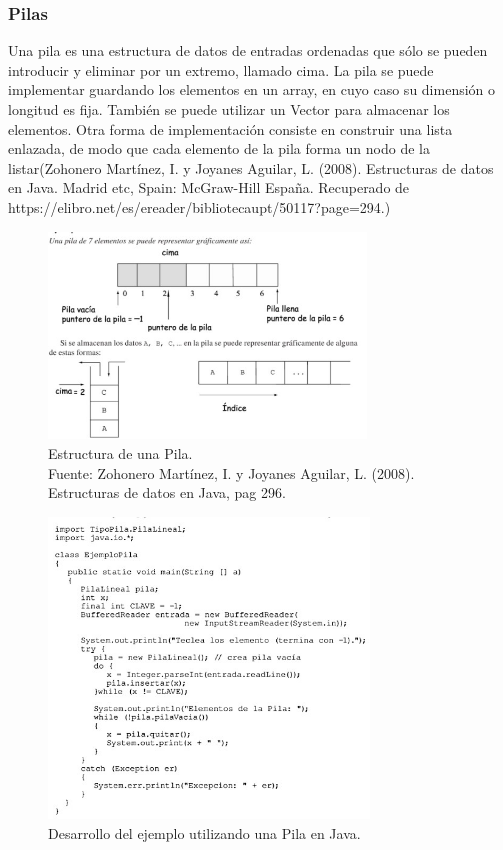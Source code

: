 \documentclass{article}
\begin{document}
\subsubsection{Pilas}
Una pila es una estructura de datos de entradas ordenadas que sólo se pueden introducir y eliminar por un extremo, llamado cima. La pila se puede implementar guardando los elementos en un array, en cuyo caso su dimensión o longitud es fija. También se puede utilizar un Vector para almacenar los elementos. Otra forma de implementación consiste en construir una lista enlazada, de modo que cada elemento de la pila forma un nodo de la listar(Zohonero Martínez, I. y Joyanes Aguilar, L. (2008). Estructuras de datos en Java. Madrid etc, Spain: McGraw-Hill España. Recuperado de https://elibro.net/es/ereader/bibliotecaupt/50117?page=294.)

\begin{figure}[ht]
    \centering     
    \includegraphics[height=5.5cm]{images/figura3.jpg}
    \caption{Estructura de una Pila.\\Fuente: Zohonero Martínez, I. y Joyanes Aguilar, L. (2008). Estructuras de datos en Java, pag 296.}
    \label{fig:BiasVqeoltage}
    
\end{figure}
\begin{figure}[ht]
    \centering     
    \includegraphics[height=8cm]{images/figura4.jpg}
    \caption{Desarrollo del ejemplo utilizando una Pila en Java.}
    \label{fig:BiasVoltager}
    
\end{figure}
\end{document}
